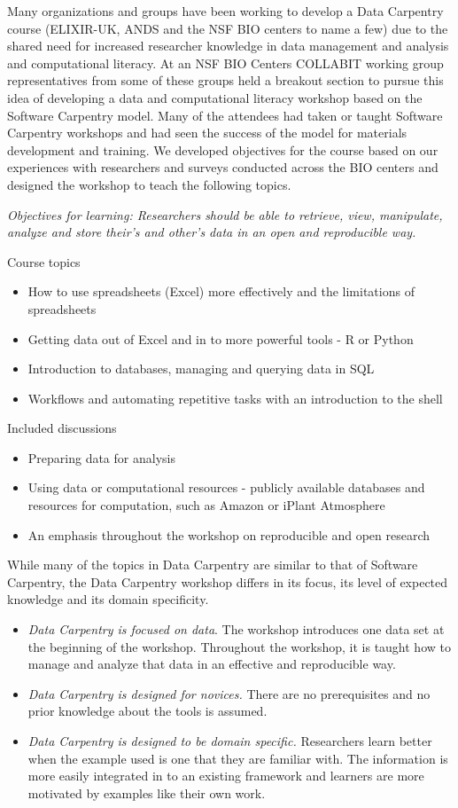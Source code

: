 \documentclass[11pt]{article}
\begin{document}
Many organizations and groups have been working to develop a Data Carpentry course (ELIXIR-UK, ANDS and the NSF BIO centers to name a few) due to the shared need for increased researcher knowledge in data management and analysis and computational literacy. At an NSF BIO Centers COLLABIT working group representatives from some of these groups held a breakout section to pursue this idea of developing a data and computational literacy workshop based on the Software Carpentry model. Many of the attendees had taken or taught Software Carpentry workshops and
had seen the success of the model for materials development and training. We developed objectives for the course based on our experiences with researchers and surveys conducted across the BIO centers and designed the workshop to teach the following topics.

\emph{Objectives for learning: Researchers should be able to retrieve, view, manipulate, analyze and store their's and other's data in an open and reproducible way.}

Course topics
\begin{itemize}
\item How to use spreadsheets (Excel) more effectively and the limitations of spreadsheets
\item Getting data out of Excel and in to more powerful tools - R or Python
\item Introduction to databases, managing and querying data in SQL
\item Workflows and automating repetitive tasks with an introduction to the shell
\end{itemize}

Included discussions
\begin{itemize}
\item Preparing data for analysis
\item Using data or computational resources - publicly available databases and resources for computation, such as Amazon or  iPlant Atmosphere
\item An emphasis throughout the workshop on reproducible and open research 
\end{itemize}

While many of the topics in Data Carpentry are similar to that of Software Carpentry, the Data Carpentry 
workshop differs in its focus, its level of expected knowledge and its domain specificity.
\begin{itemize}
\item \emph{Data Carpentry is focused on data}. The workshop introduces one data set at the beginning of the
workshop. Throughout the workshop, it is taught how to manage and analyze that data in an effective and reproducible 
way.
\item \emph{Data Carpentry is designed for novices.} There are no prerequisites and no 
prior knowledge about the tools is assumed.
\item \emph{Data Carpentry is designed to be domain specific.} Researchers learn better when the example used is
one that they are familiar with. The information is more easily integrated in to an existing framework and learners 
are more motivated by examples like their own work.
\end{itemize}
\end{document}
